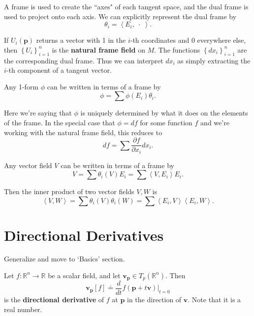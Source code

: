 \documentclass[10pt]{report}
\begin{document}
A frame is used to create the ``axes" of each tangent space, and the dual frame is used to project onto each axis. We can explicitly represent the dual frame by
\[
	\theta_i = \left\langle E_i, \;\cdot\; \right\rangle.
\] 

\begin{ex}[]
	If $U_i(\mathbf{p})$ returns a vector with 1 in the $i$-th coordinates and 0 everywhere else, then $\left\{ U_i \right\}_{i=1}^n$ is the \textbf{natural frame field} on $M$. The functions $\left\{ dx_{i} \right\}_{i=1}^n$ are the corresponding dual frame. Thus we can interpret $dx_i$ as simply extracting the $ i$-th component of a tangent vector.
\end{ex}

\begin{prop}
Any 1-form $\phi$ can be written in terms of a frame by
\[
	\phi = \sum \phi(E_i) \theta_i.
\] 
\end{prop}

Here we're saying that $\phi$ is uniquely determined by what it does on the elements of the frame. In the special case that $\phi = df$ for some function $f$ and we're working with the natural frame field, this reduces to
\[
df = \sum \frac{\partial f}{\partial x_i} dx_i.
\] 

\begin{prop}
Any vector field $V$ can be written in terms of a frame by
\[V = \sum \theta_i(V) E_i = \sum \left\langle V,E_i \right\rangle E_i.\]
\end{prop}

Then the inner product of two vector fields $V,W$ is
\[
	\left\langle V,W \right\rangle = \sum \theta_i(V) \theta_i(W) = \sum \left\langle E_i, V \right\rangle \left\langle E_i, W \right\rangle.
\] 



\section{Directional Derivatives}

{\color{red}Generalize and move to `Basics' section.}

\begin{defn}
	Let $f:\mathbb{R}^n \to \mathbb{R}$ be a scalar field, and let $\mathbf{v}_{\mathbf{p}} \in T_p(\mathbb{R}^n)$. Then
	\[
		\mathbf{v}_{\mathbf{p}}[f] \doteq \frac{d }{d t} f(\mathbf{p}+t\mathbf{v}) \Big|_{t=0}
\] is the \textbf{directional derivative} of $f$ at $\mathbf{p}$ in the direction of $\mathbf{v}$. Note that it is a real number.
\end{defn}
\end{document}
